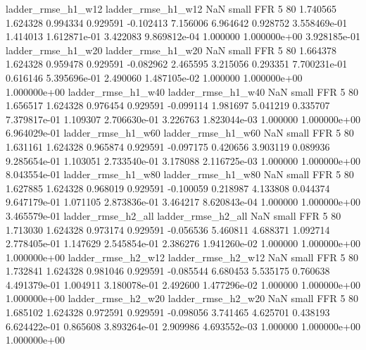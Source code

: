       ladder_rmse_h1_w12       ladder_rmse_h1_w12                   NaN      small      FFR                 5 80 1.740565       1.624328 0.994334       0.929591   -0.102413      7.156006      6.964642     0.928752   3.558469e-01  1.414013 1.612871e-01     3.422083   9.869812e-04            1.000000    1.000000e+00        3.928185e-01
      ladder_rmse_h1_w20       ladder_rmse_h1_w20                   NaN      small      FFR                 5 80 1.664378       1.624328 0.959478       0.929591   -0.082962      2.465595      3.215056     0.293351   7.700231e-01  0.616146 5.395696e-01     2.490060   1.487105e-02            1.000000    1.000000e+00        1.000000e+00
      ladder_rmse_h1_w40       ladder_rmse_h1_w40                   NaN      small      FFR                 5 80 1.656517       1.624328 0.976454       0.929591   -0.099114      1.981697      5.041219     0.335707   7.379817e-01  1.109307 2.706630e-01     3.226763   1.823044e-03            1.000000    1.000000e+00        6.964029e-01
      ladder_rmse_h1_w60       ladder_rmse_h1_w60                   NaN      small      FFR                 5 80 1.631161       1.624328 0.965874       0.929591   -0.097175      0.420656      3.903119     0.089936   9.285654e-01  1.103051 2.733540e-01     3.178088   2.116725e-03            1.000000    1.000000e+00        8.043554e-01
      ladder_rmse_h1_w80       ladder_rmse_h1_w80                   NaN      small      FFR                 5 80 1.627885       1.624328 0.968019       0.929591   -0.100059      0.218987      4.133808     0.044374   9.647179e-01  1.071105 2.873836e-01     3.464217   8.620843e-04            1.000000    1.000000e+00        3.465579e-01
      ladder_rmse_h2_all       ladder_rmse_h2_all                   NaN      small      FFR                 5 80 1.713030       1.624328 0.973174       0.929591   -0.056536      5.460811      4.688371     1.092714   2.778405e-01  1.147629 2.545854e-01     2.386276   1.941260e-02            1.000000    1.000000e+00        1.000000e+00
      ladder_rmse_h2_w12       ladder_rmse_h2_w12                   NaN      small      FFR                 5 80 1.732841       1.624328 0.981046       0.929591   -0.085544      6.680453      5.535175     0.760638   4.491379e-01  1.004911 3.180078e-01     2.492600   1.477296e-02            1.000000    1.000000e+00        1.000000e+00
      ladder_rmse_h2_w20       ladder_rmse_h2_w20                   NaN      small      FFR                 5 80 1.685102       1.624328 0.972591       0.929591   -0.098056      3.741465      4.625701     0.438193   6.624422e-01  0.865608 3.893264e-01     2.909986   4.693552e-03            1.000000    1.000000e+00        1.000000e+00
